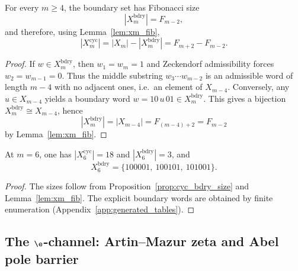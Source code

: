 \begin{proposition}\label{prop:cyc_bdry_size}
For every $m\ge 4$, the boundary set has Fibonacci size
\[
|X_m^{\mathrm{bdry}}|=F_{m-2},
\]
and therefore, using Lemma~\ref{lem:xm_fib},
\[
|X_m^{\mathrm{cyc}}|=|X_m|-|X_m^{\mathrm{bdry}}|=F_{m+2}-F_{m-2}.
\]
\end{proposition}
\begin{proof}
If $w\in X_m^{\mathrm{bdry}}$, then $w_1=w_m=1$ and Zeckendorf admissibility forces $w_2=w_{m-1}=0$.
Thus the middle substring $w_3\cdots w_{m-2}$ is an admissible word of length $m-4$ with no adjacent ones, i.e.\ an element of $X_{m-4}$.
Conversely, any $u\in X_{m-4}$ yields a boundary word $w=10\,u\,01\in X_m^{\mathrm{bdry}}$.
This gives a bijection $X_m^{\mathrm{bdry}}\cong X_{m-4}$, hence
\[
|X_m^{\mathrm{bdry}}|=|X_{m-4}|=F_{(m-4)+2}=F_{m-2}
\]
by Lemma~\ref{lem:xm_fib}.
\end{proof}

\begin{corollary}[Canonical $18\oplus 3$ split at $m=6$]\label{prop:cyc_bdry_6}
At $m=6$, one has $|X_6^{\mathrm{cyc}}|=18$ and $|X_6^{\mathrm{bdry}}|=3$, and
\[
X_6^{\mathrm{bdry}}=\{100001,\ 100101,\ 101001\}.
\]
\end{corollary}
\begin{proof}
The sizes follow from Proposition~\ref{prop:cyc_bdry_size} and Lemma~\ref{lem:xm_fib}.
The explicit boundary words are obtained by finite enumeration (Appendix~\ref{app:generated_tables}).
\end{proof}

\subsection{The \texorpdfstring{$\e$}{e}-channel: Artin--Mazur zeta and Abel pole barrier}
\label{subsec:e_channel}

